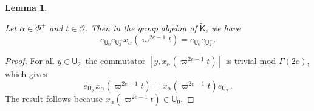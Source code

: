 \documentclass[10pt, letterpaper]{amsart}
\theoremstyle{plain}
\newtheorem{Lem}[equation]{Lemma}
\theoremstyle{definition}
\numberwithin{equation}{section}
\newcommand{\Kf}{\mathsf{K}}
\newcommand{\Uf}{\mathsf{U}}
\begin{document}
\begin{Lem} \label{+-IdemSwap}

	Let $\alpha\in\Phi^{+}$ and $t\in \mathcal{O}$. Then in the group algebra of $\widetilde{{\Kf}}$, we have
	\begin{equation*}
		e_{{\Uf}_{0}}e_{{\Uf}^{-}_{2}}x_{\alpha}(\varpi^{2e-1}t)=e_{{\Uf}_{0}}e_{{\Uf}^{-}_{2}}.
	\end{equation*}
\end{Lem}

\begin{proof}
	 For all $y\in {\Uf}^{-}_{2}$ the commutator $[y,x_{\alpha}(\varpi^{2e-1}t)]$ is trivial mod $\Gamma(2e)$, which gives
     \[
     e_{{\Uf}^{-}_{2}}x_{\alpha}(\varpi^{2e-1}t)=x_{\alpha}(\varpi^{2e-1}t)e_{{\Uf}^{-}_{2}}.
     \]
     The result follows because $x_{\alpha}(\varpi^{2e-1}t)\in {\Uf}_{0}$.
\end{proof}
\end{document}
